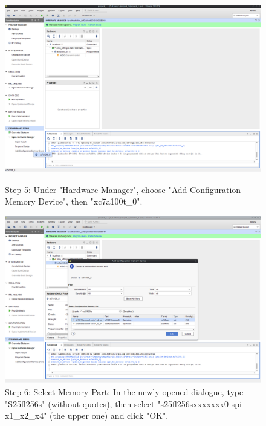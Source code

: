 \begin{figure}[H]
  \centering
  \includegraphics[width=0.8\linewidth]{images/vivado05.png}
  \captionsetup{width=0.8\linewidth}
  \caption{Step 5: Under "Hardware Manager", choose "Add Configuration
           Memory Device", then "xc7a100t\_0".}
  \label{fig:vivado05}

\vspace{5mm}

  \includegraphics[width=0.8\linewidth]{images/vivado06.png}
  \captionsetup{width=0.8\linewidth}
  \caption{Step 6: Select Memory Part:
           In the newly opened dialogue, type "S25fl256s"
           (without quotes), then select "s25fl256sxxxxxxx0-spi-x1\_x2\_x4"
           (the upper one) and click "OK".}
  \label{fig:vivado06}
\end{figure}


